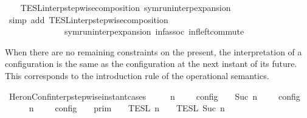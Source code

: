 \begin{isabellebody}
%
\isadelimproof
\ \ %
\endisadelimproof
%
\isatagproof
{}\isamarkupfalse%
\ TESL{\isacharunderscore}interp{\isacharunderscore}stepwise{\isacharunderscore}composition\ symrun{\isacharunderscore}interp{\isacharunderscore}expansion\isanewline
{}\isamarkupfalse%
\ {\isacharparenleft}simp\ add{\isacharcolon}\ TESL{\isacharunderscore}interp{\isacharunderscore}stepwise{\isacharunderscore}composition\isanewline
\ \ \ \ \ \ \ \ \ \ \ \ \ \ symrun{\isacharunderscore}interp{\isacharunderscore}expansion\ inf{\isacharunderscore}assoc\ inf{\isacharunderscore}left{\isacharunderscore}commute{\isacharparenright}%
\endisatagproof
{\isafoldproof}%
%
\isadelimproof
%
\endisadelimproof
%
\begin{isamarkuptext}%
When there are no remaining constraints on the present, the interpretation of
  a configuration is the same as the configuration at the next instant of its future.
  This corresponds to the introduction rule of the operational semantics.%
\end{isamarkuptext}\isamarkuptrue%
\isamarkupfalse%
\ HeronConf{\isacharunderscore}interp{\isacharunderscore}stepwise{\isacharunderscore}instant{\isacharunderscore}cases{\isacharcolon}\isanewline
\ \ \ {\isacartoucheopen}{\isasymlbrakk}\ {\isasymGamma}{\isacharcomma}\ n\ {\isasymturnstile}\ {\isacharbrackleft}{\isacharbrackright}\ {\isasymtriangleright}\ {\isasymPhi}\ {\isasymrbrakk}\isactrlsub c\isactrlsub o\isactrlsub n\isactrlsub f\isactrlsub i\isactrlsub g\ {\isacharequal}\ {\isasymlbrakk}\ {\isasymGamma}{\isacharcomma}\ Suc\ n\ {\isasymturnstile}\ {\isasymPhi}\ {\isasymtriangleright}\ {\isacharbrackleft}{\isacharbrackright}\ {\isasymrbrakk}\isactrlsub c\isactrlsub o\isactrlsub n\isactrlsub f\isactrlsub i\isactrlsub g{\isacartoucheclose}\isanewline
%
\isadelimproof
%
\endisadelimproof
%
\isatagproof
{}\isamarkupfalse%
\ {\isacharminus}\isanewline
\ \ \isamarkupfalse%
\ {\isacartoucheopen}{\isasymlbrakk}\ {\isasymGamma}{\isacharcomma}\ n\ {\isasymturnstile}\ {\isacharbrackleft}{\isacharbrackright}\ {\isasymtriangleright}\ {\isasymPhi}\ {\isasymrbrakk}\isactrlsub c\isactrlsub o\isactrlsub n\isactrlsub f\isactrlsub i\isactrlsub g\ {\isacharequal}\ {\isasymlbrakk}{\isasymlbrakk}\ {\isasymGamma}\ {\isasymrbrakk}{\isasymrbrakk}\isactrlsub p\isactrlsub r\isactrlsub i\isactrlsub m\ {\isasyminter}\ {\isasymlbrakk}{\isasymlbrakk}\ {\isacharbrackleft}{\isacharbrackright}\ {\isasymrbrakk}{\isasymrbrakk}\isactrlsub T\isactrlsub E\isactrlsub S\isactrlsub L\isactrlbsup {\isasymge}\ n\isactrlesup \ {\isasyminter}\ {\isasymlbrakk}{\isasymlbrakk}\ {\isasymPhi}\ {\isasymrbrakk}{\isasymrbrakk}\isactrlsub T\isactrlsub E\isactrlsub S\isactrlsub L\isactrlbsup {\isasymge}\ Suc\ n\isactrlesup {\isacartoucheclose}\isanewline

\end{isabellebody}
